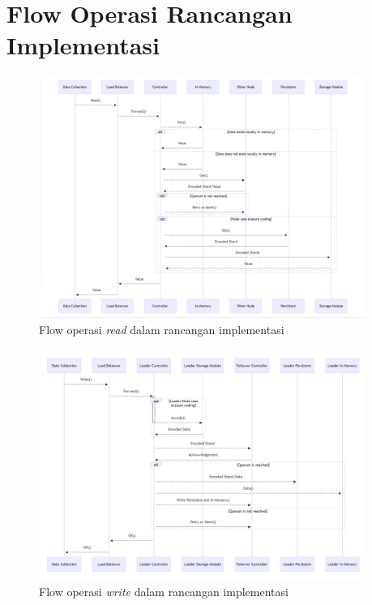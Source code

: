 \chapter{Flow Operasi Rancangan Implementasi}
\label{appendix:flow}

\begin{figure}[!h]
    \centering
    \includegraphics[width=0.95\textwidth]{resources/appendix/flow-read-mermaidjs.png}
    \caption{Flow operasi \textit{read} dalam rancangan implementasi}
    \label{fig:flow-read-mermaidjs}
\end{figure}

\begin{figure}[!h]
    \centering
    \includegraphics[width=0.95\textwidth]{resources/appendix/flow-write-mermaidjs.png}
    \caption{Flow operasi \textit{write} dalam rancangan implementasi}
    \label{fig:flow-write-mermaidjs}
\end{figure}
